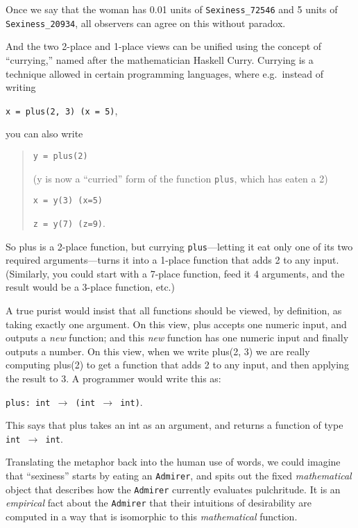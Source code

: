  Once we say that the woman has 0.01 units of \texttt{Sexiness\_72546} and 5
units of \texttt{Sexiness\_20934}, all observers can agree on this without
paradox.


 And the two 2-place and 1-place views can be unified using the
concept of ``currying,'' named after
the mathematician Haskell Curry. Currying is a technique allowed in
certain programming languages, where e.g.~instead of writing

\begin{center}
\texttt{x = plus(2, 3) (x = 5)},
\end{center}



 you can also write

\begin{quotation}
\texttt{y = plus(2)}

 (y is now a ``curried'' form of
the function \texttt{plus}, which has eaten a 2)

 \texttt{x = y(3) (x=5)}

 \texttt{z = y(7) (z=9)}.
\end{quotation}


 So plus is a 2-place function, but currying \texttt{plus}---letting it eat
only one of its two required arguments---turns it into a 1-place
function that adds 2 to any input. (Similarly, you could start with a
7-place function, feed it 4 arguments, and the result would be a
3-place function, etc.)


 A true purist would insist that all functions should be viewed, by
definition, as taking exactly one argument. On this view, plus accepts
one numeric input, and outputs a \textit{new} function; and this
\textit{new} function has one numeric input and finally outputs a
number. On this view, when we write plus(2, 3) we are really computing
plus(2) to get a function that adds 2 to any input, and then applying
the result to 3. A programmer would write this as:

\begin{center}
\texttt{plus: int $\rightarrow $ (int $\rightarrow $ int)}.
\end{center}


 This says that plus takes an int as an argument, and returns a
function of type \texttt{int $\rightarrow $ int}.


 Translating the metaphor back into the human use of words, we
could imagine that ``sexiness''
starts by eating an \texttt{Admirer}, and spits out the fixed
\textit{mathematical} object that describes how the \texttt{Admirer} currently
evaluates pulchritude. It is an \textit{empirical} fact about the
\texttt{Admirer} that their intuitions of desirability are computed in a way
that is isomorphic to this \textit{mathematical} function.


